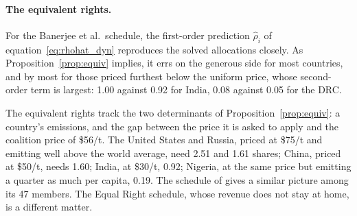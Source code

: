 \documentclass[12pt,english]{article}
\theoremstyle{remark}
\begin{document}


\paragraph{The equivalent rights.} 

For the Banerjee et al.\ schedule, the first-order prediction $\hat\rho_i$ of equation~\eqref{eq:rhohat_dyn} reproduces the solved allocations closely. As Proposition~\ref{prop:equiv} implies, it errs on the generous side for most countries, and by most for those priced furthest below the uniform price, whose second-order term is largest: 1.00 against 0.92 for India, 0.08 against 0.05 for the DRC.

The equivalent rights track the two determinants of Proposition~\ref{prop:equiv}: a country's emissions, and the gap between the price it is asked to apply and the coalition price of \$56/t. 
The United States and Russia, priced at \$75/t and emitting well above the world average, need 2.51 and 1.61 shares; China, priced at \$50/t, needs 1.60; India, at \$30/t, 0.92; Nigeria, at the same price but emitting a quarter as much per capita, 0.19. The schedule of \citet{wolfram_building_2025} gives a similar picture among its 47 members. The Equal Right schedule, whose revenue does not stay at home, is a different matter.
\end{document}
